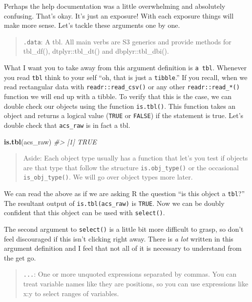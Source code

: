 \documentclass[
]{book}
\newenvironment{Shaded}{\begin{snugshade}}{\end{snugshade}}
\newcommand{\CommentTok}[1]{\textcolor[rgb]{0.56,0.35,0.01}{\textit{#1}}}
\newcommand{\KeywordTok}[1]{\textcolor[rgb]{0.13,0.29,0.53}{\textbf{#1}}}
\newcommand{\NormalTok}[1]{#1}
\begin{document}
Perhaps the help documentation was a little overwhelming and absolutely confusing. That's okay. It's just an exposure! With each exposure things will make more sense. Let's tackle these arguments one by one.

\begin{quote}
\texttt{.data}: A tbl. All main verbs are S3 generics and provide methods for tbl\_df(), dtplyr::tbl\_dt() and dbplyr::tbl\_dbi().
\end{quote}

What I want you to take away from this argument definition is \texttt{a\ tbl}. Whenever you read \texttt{tbl} think to your self ``oh, that is just a \texttt{tibble}.'' If you recall, when we read rectangular data with \texttt{readr::read\_csv()} or any other \texttt{readr::read\_*()} function we will end up with a tibble. To verify that this is the case, we can double check our objects using the function \texttt{is.tbl()}. This function takes an object and returns a logical value (\texttt{TRUE} or \texttt{FALSE}) if the statement is true. Let's double check that \texttt{acs\_raw} is in fact a tbl.

\begin{Shaded}
\begin{Highlighting}[]
\KeywordTok{is.tbl}\NormalTok{(acs\_raw)}
\CommentTok{\#\textgreater{} [1] TRUE}
\end{Highlighting}
\end{Shaded}

\begin{quote}
Aside: Each object type usually has a function that let's you test if objects are that type that follow the structure \texttt{is.obj\_type()} or the occasional \texttt{is\_obj\_type()}. We will go over object types more later.
\end{quote}

We can read the above as if we are asking R the question ``is this object a \texttt{tbl}?'' The resultant output of \texttt{is.tbl(acs\_raw)} is \texttt{TRUE}. Now we can be doubly confident that this object can be used with \texttt{select()}.

The second argument to \texttt{select()} is a little bit more difficult to grasp, so don't feel discouraged if this isn't clicking right away. There is \emph{a lot} written in this argument definition and I feel that not all of it is necessary to understand from the get go.

\begin{quote}
\texttt{...}: One or more unquoted expressions separated by commas. You can treat variable names like they are positions, so you can use expressions like x:y to select ranges of variables.
\end{quote}
\end{document}
